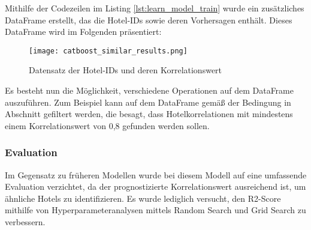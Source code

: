 Mithilfe der Codezeilen im Listing \ref{lst:learn_model_train} wurde ein zusätzliches DataFrame erstellt, das die Hotel-IDs sowie deren Vorhersagen enthält. Dieses DataFrame wird im Folgenden präsentiert:

\begin{figure}[h]
    \centering
    \texttt{[image: catboost\_similar\_results.png]}
    \caption[Datensatz der Hotel-IDs und deren Korrelationswert]{Datensatz der Hotel-IDs und deren Korrelationswert}
    \label{img:catboost_similar_results}
\end{figure}

Es besteht nun die Möglichkeit, verschiedene Operationen auf dem DataFrame auszuführen. Zum Beispiel kann auf dem DataFrame gemäß der Bedingung in Abschnitt \emph{} gefiltert werden, die besagt, dass Hotelkorrelationen mit mindestens einem Korrelationswert von 0,8 gefunden werden sollen.

\subsubsection{Evaluation}
\label{subsubsec:learn_eval}
Im Gegensatz zu früheren Modellen wurde bei diesem Modell auf eine umfassende Evaluation verzichtet, da der prognostizierte Korrelationswert ausreichend ist, um ähnliche Hotels zu identifizieren. Es wurde lediglich versucht, den R2-Score mithilfe von Hyperparameteranalysen mittels Random Search 
\cite{AdapRandomSearch4.05.2009} und Grid Search \cite{Liashchynskyi.12.12.2019} zu verbessern.


